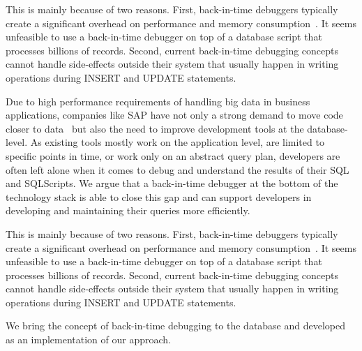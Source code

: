 
\tmpStart
This is mainly because of two reasons. 
First, back-in-time debuggers typically create a significant overhead on performance and memory consumption~\cite{lewis03:debugging_backwards_in_time,pothier07:scalable_omniscient_debugging,lienhard08:practical_object-oriented_back-in-time_debugging}.
It seems unfeasible to use a back-in-time debugger on top of a database script that processes billions of records.
Second, current back-in-time debugging concepts cannot handle side-effects outside their system that usually happen in writing operations during INSERT and UPDATE statements. 

Due to high performance requirements of handling big data in business applications, companies like SAP have not only a strong demand to move code closer to data~\cite{plattner15:the_in-memory_revolution_how} but also the need to improve development tools at the database-level. 
As existing tools mostly work on the application level, are limited to specific points in time, or work only on an abstract query plan, developers are often left alone when it comes to debug and understand the results of their SQL and SQLScripts.
We argue that a back-in-time debugger at the bottom of the technology stack is able to close this gap and can support developers in developing and maintaining their queries more efficiently. 
\tmpEnd

\tmpStart

This is mainly because of two reasons. 
First, back-in-time debuggers typically create a significant overhead on performance and memory consumption~\cite{lewis03:debugging_backwards_in_time,pothier07:scalable_omniscient_debugging,lienhard08:practical_object-oriented_back-in-time_debugging}.
It seems unfeasible to use a back-in-time debugger on top of a database script that processes billions of records.
Second, current back-in-time debugging concepts cannot handle side-effects outside their system that usually happen in writing operations during INSERT and UPDATE statements. 

We bring the concept of back-in-time debugging to the database and developed \emph{\tool} as an implementation of our approach.

